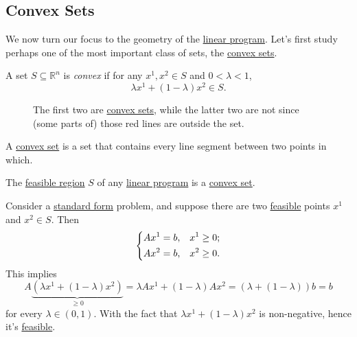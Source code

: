 \subsection{Convex Sets}
We now turn our focus to the geometry of the \hyperref[def:general-linear-programming-problem]{linear program}. Let's first study perhaps one of the most important class of sets, the \hyperref[def:convex-set]{convex sets}.

\begin{definition}\label{def:convex-set}
	A set \(S\subseteq \mathbb{R}^n\) is \emph{convex} if for any \(x^1, x^2\in S\) and \(0 < \lambda < 1\),
	\[
		\lambda x^1 + (1-\lambda)x^2 \in S.
	\]
\end{definition}

\begin{figure}[H]
	\centering
	\caption{The first two are \hyperref[def:convex-set]{convex sets}, while the latter two are not since (some parts of) those red lines are outside the set.}
	\label{fig:convex-set}
\end{figure}

\begin{intuition}
	A \hyperref[def:convex-set]{convex set} is a set that contains every line segment between two points in which.
\end{intuition}

\begin{remark}
	The \hyperref[def:feasible-region]{feasible region} \(S\) of any \hyperref[def:general-linear-programming-problem]{linear program} is a \hyperref[def:convex-set]{convex set}.
\end{remark}
\begin{explanation}
	Consider a \hyperref[def:standard-form]{standard form} problem, and suppose there are two \hyperref[def:feasible-solution]{feasible} points \(x^1\) and \(x^2\in S\). Then
	\[
		\begin{dcases}
			Ax^1 = b, & x^1\geq 0 ; \\
			Ax^2 = b, & x^2\geq 0 . \\
		\end{dcases}
	\]
	This implies
	\[
		A\underbrace{(\lambda x^1 + (1-\lambda)x^2)}_{\geq 0}
		= \lambda A x^1 + (1-\lambda)A x^2
		= (\lambda + (1-\lambda))b
		= b
	\]
	for every \(\lambda \in (0,1)\). With the fact that \(\lambda x^1 + (1-\lambda)x^2\) is non-negative, hence it's \hyperref[def:feasible-solution]{feasible}.
\end{explanation}

